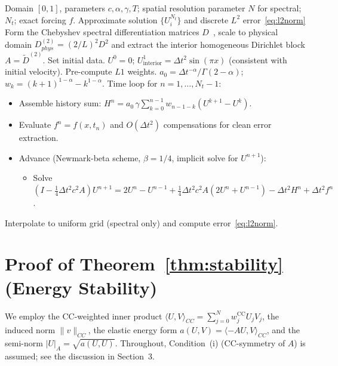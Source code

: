 \documentclass[a4paper,fleqn]{cas-sc}
\begin{document}
\begin{appendix}
\begin{algorithm}
\caption{Time-marching scheme for the fractional wave equation (Newmark averaging)}
\begin{algorithmic}[1]
\REQUIRE Domain $[0,1]$, parameters $c,\alpha,\gamma,T$; spatial resolution parameter $N$ for spectral; $N_t$; exact forcing $f$.
\ENSURE Approximate solution $\{U_i^{N_t}\}$ and discrete $L^2$ error~\eqref{eq:l2norm}
\STATE Form the Chebyshev spectral differentiation matrices $D$~\cite{ref5}, scale to physical domain $D_{phys}^{(2)} = (2/L)^2 D^2$ and extract the interior homogeneous Dirichlet block $A = \tilde D^{(2)}$.
\STATE Set initial data. $U^0 = 0$; $U^1_{\text{interior}} = \Delta t^2 \sin(\pi x)$ (consistent with initial velocity).
\STATE Pre-compute $L1$ weights. $a_0 = \Delta t^{-\alpha}/\Gamma(2-\alpha)$; $w_k = (k+1)^{1-\alpha} - k^{1-\alpha}$.
\STATE Time loop for $n = 1, \ldots, N_t - 1$:
  \begin{itemize}
    \item[a)] Assemble history sum: $H^n = a_0\,\gamma\sum_{k=0}^{n-1}w_{n-1-k}(U^{k+1}-U^{k})$.
    \item[b)] Evaluate $f^n = f(x, t_n)$ and $O(\Delta t^2)$ compensations for clean error extraction.
    \item[c)] Advance (Newmark-beta scheme, $\beta=1/4$, implicit solve for $U^{n+1}$):
      \begin{itemize}
        \item Solve $(I - \frac{1}{4}\Delta t^2 c^2 A) U^{n+1} = 2U^n - U^{n-1} + \frac{1}{4}\Delta t^2 c^2 A (2U^n + U^{n-1}) - \Delta t^2 H^n + \Delta t^2 f^n$.
      \end{itemize}
  \end{itemize}
\STATE Interpolate to uniform grid (spectral only) and compute error~\eqref{eq:l2norm}.
\end{algorithmic}
\end{algorithm}


\section{Proof of Theorem~\ref{thm:stability} (Energy Stability)}\label{app:proof_theorem1}

We employ the CC-weighted inner product $\langle U, V \rangle_{CC} = \sum_{j=0}^N w_j^{\mathrm{CC}} U_j V_j$, the induced norm $\|v\|_{CC}$, the elastic energy form $a(U, V) = \langle -A U, V \rangle_{CC}$, and the semi-norm $|U|_A = \sqrt{a(U, U)}$. Throughout, Condition~(i) (CC-symmetry of $A$) is assumed; see the discussion in Section~3.


\end{appendix}
\end{document}
